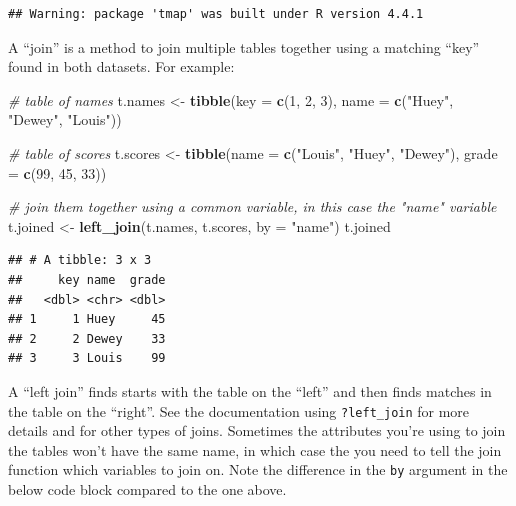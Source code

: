 \documentclass[]{article}
\newenvironment{Shaded}{\begin{snugshade}}{\end{snugshade}}
\newcommand{\AttributeTok}[1]{\textcolor[rgb]{0.13,0.29,0.53}{#1}}
\newcommand{\CommentTok}[1]{\textcolor[rgb]{0.56,0.35,0.01}{\textit{#1}}}
\newcommand{\DecValTok}[1]{\textcolor[rgb]{0.00,0.00,0.81}{#1}}
\newcommand{\FunctionTok}[1]{\textcolor[rgb]{0.13,0.29,0.53}{\textbf{#1}}}
\newcommand{\NormalTok}[1]{#1}
\newcommand{\OtherTok}[1]{\textcolor[rgb]{0.56,0.35,0.01}{#1}}
\newcommand{\StringTok}[1]{\textcolor[rgb]{0.31,0.60,0.02}{#1}}
\begin{document}
\begin{verbatim}
## Warning: package 'tmap' was built under R version 4.4.1
\end{verbatim}

A ``join'' is a method to join multiple tables together using a matching
``key'' found in both datasets. For example:

\begin{Shaded}
\begin{Highlighting}[]
\CommentTok{\# table of names}
\NormalTok{t.names }\OtherTok{\textless{}{-}} \FunctionTok{tibble}\NormalTok{(}\AttributeTok{key =} \FunctionTok{c}\NormalTok{(}\DecValTok{1}\NormalTok{, }\DecValTok{2}\NormalTok{, }\DecValTok{3}\NormalTok{), }
             \AttributeTok{name =} \FunctionTok{c}\NormalTok{(}\StringTok{"Huey"}\NormalTok{, }\StringTok{"Dewey"}\NormalTok{, }\StringTok{"Louis"}\NormalTok{))}

\CommentTok{\# table of scores}
\NormalTok{t.scores }\OtherTok{\textless{}{-}} \FunctionTok{tibble}\NormalTok{(}\AttributeTok{name =} \FunctionTok{c}\NormalTok{(}\StringTok{"Louis"}\NormalTok{, }\StringTok{"Huey"}\NormalTok{, }\StringTok{"Dewey"}\NormalTok{),}
                   \AttributeTok{grade =} \FunctionTok{c}\NormalTok{(}\DecValTok{99}\NormalTok{, }\DecValTok{45}\NormalTok{, }\DecValTok{33}\NormalTok{))}

\CommentTok{\# join them together using a common variable, in this case the "name" variable}
\NormalTok{t.joined }\OtherTok{\textless{}{-}} \FunctionTok{left\_join}\NormalTok{(t.names, t.scores, }\AttributeTok{by =} \StringTok{"name"}\NormalTok{)}
\NormalTok{t.joined}
\end{Highlighting}
\end{Shaded}

\begin{verbatim}
## # A tibble: 3 x 3
##     key name  grade
##   <dbl> <chr> <dbl>
## 1     1 Huey     45
## 2     2 Dewey    33
## 3     3 Louis    99
\end{verbatim}

A ``left join'' finds starts with the table on the ``left'' and then
finds matches in the table on the ``right''. See the documentation using
\texttt{?left\_join} for more details and for other types of joins.
Sometimes the attributes you're using to join the tables won't have the
same name, in which case the you need to tell the join function which
variables to join on. Note the difference in the \texttt{by} argument in
the below code block compared to the one above.
\end{document}
